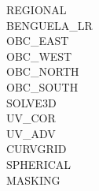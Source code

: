 %
REGIONAL\\
BENGUELA\_LR\\
OBC\_EAST\\
OBC\_WEST\\
OBC\_NORTH\\
OBC\_SOUTH\\
SOLVE3D\\
UV\_COR\\
UV\_ADV\\
CURVGRID\\
SPHERICAL\\
MASKING\\
